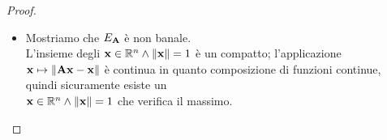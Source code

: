 \documentclass[a4paper,11pt,openright,twoside	]{book}
\begin{document}
\begin{proof}
\begin{itemize}
\[ \norm{\vb{A(x+y) - (x+y)}}^2 - m(\vb{A})^2 \norm{\vb{x+y}}^2=  m(\vb{A})^2 \norm{\vb{x-y}}^2 - \norm{\vb{A(x-y) - (x-y)}}^2 \]
\`E possibile poi scomporre le differenze di quadrati a sinistra e destra dell'uguaglianza ottenendo
\begin{equation} 
\begin{split}
\big( & \norm{\vb{A(x+y) - (x+y)}}  + m(\vb{A})\norm{\vb{x+y}} \big) \big( \norm{\vb{A(x+y) - (x+y)}} - m(\vb{A}) \norm{\vb{x+y}} \big) = \\
& -\big( \norm{\vb{A(x-y) - (x-y)}} + m(\vb{A})\norm{\vb{x-y}} \big) \big( \norm{\vb{A(x-y) - (x-y)}} - m(\vb{A}) \norm{\vb{x-y}} \big).
\end{split}
\end{equation}
Distinguiamo alcuni casi: 
\begin{itemize}
\item Se $\vb{A} = \vb{id} \Rightarrow m(\vb{A}) = 0 \Rightarrow E_{\vb{A}} = \mathbb{R}^{n}$  ed in quel caso la dimostrazione è conclusa.
\item Se $\vb{x} = \vb{y}$ o $\vb{x} = \vb{-y}$  la dimostrazione è conclusa per il punto precedente (rispettivamente con $\lambda = +1$ e $\lambda = -1$). 
\item Nei restanti casi si osserva che nell'equazione (5) il primo fattore a sinistra dell'uguaglianza è strettamente positivo, mentre il secondo fattore è $\leq 0 $. Allo stesso modo a destra dell'uguaglianza è presente un meno che modifica il segno del prodotto; il primo fattore è strettamente positivo ed il secondo è $\leq 0 $. \\ L'uguaglianza in (5) deve quindi per forza coincidere con $0=0$ e questo implica 
\begin{equation*}
  \left\{
    \begin{aligned}
      & \norm{\vb{A(x+y) - (x+y)}} = m(\vb{A})\norm{\vb{x+y}} \\
      & \norm{\vb{A(x-y) - (x-y)}} = m(\vb{A})\norm{\vb{x-y}} 
    \end{aligned}
  \right.
\end{equation*}
$\Longrightarrow \vb{x+y, x-y} \in E_{\vb{A}} $ 
\end{itemize}  
La dimostrazione del fatto che $E_{\vb{A}}$ è un sottospazio vettoriale di $\mathbb{R}^n $ è così conclusa.
\item Mostriamo che $E_{\vb{A}}$ è non banale.\\
L'insieme degli $\vb{x} \in \mathbb{R}^{n} \land \norm{\vb{x}} = 1$ è un compatto; l'applicazione $ \vb{x} \mapsto \norm{\vb{Ax-x}}$ è continua in quanto composizione di funzioni continue, quindi sicuramente esiste un \\ $\vb{x} \in \mathbb{R}^{n} \land \norm{\vb{x}} = 1$  che  verifica il massimo. \\

\end{itemize}
\end{proof}
\end{document}
